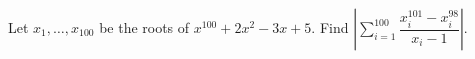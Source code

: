 Let $x_1,\ldots,x_{100}$ be the roots of $x^{100}+2x^2-3x+5$. Find $\left|\sum_{i=1}^{100}\dfrac{x_i^{101}-x_i^{98}}{x_i-1}\right|$.
